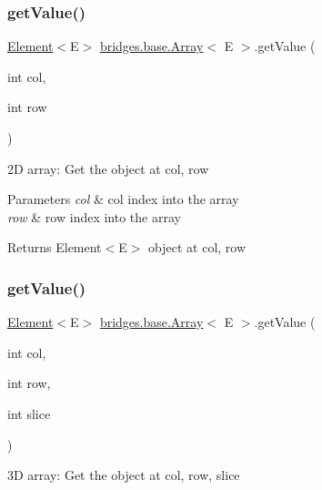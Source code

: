 \subsubsection{\texorpdfstring{get\+Value()}{getValue()}\hspace{0.1cm}{\footnotesize\ttfamily [2/3]}}
{\footnotesize\ttfamily \hyperlink{classbridges_1_1base_1_1_element}{Element}$<$E$>$ \hyperlink{classbridges_1_1base_1_1_array}{bridges.\+base.\+Array}$<$ E $>$.get\+Value (\begin{DoxyParamCaption}\item[{int}]{col,  }\item[{int}]{row }\end{DoxyParamCaption})}

2D array\+: Get the object at \textquotesingle{}col, row\textquotesingle{}


\begin{DoxyParams}{Parameters}
{\em col} & col index into the array \\
\hline
{\em row} & row index into the array\\
\hline
\end{DoxyParams}
\begin{DoxyReturn}{Returns}
Element$<$\+E$>$ object at \textquotesingle{}col, row\textquotesingle{} 
\end{DoxyReturn}
\hypertarget{classbridges_1_1base_1_1_array_a5aa6a1d31c6eadf8aa948ac2ea9a18fc}{}\label{classbridges_1_1base_1_1_array_a5aa6a1d31c6eadf8aa948ac2ea9a18fc} 
\subsubsection{\texorpdfstring{get\+Value()}{getValue()}\hspace{0.1cm}{\footnotesize\ttfamily [3/3]}}
{\footnotesize\ttfamily \hyperlink{classbridges_1_1base_1_1_element}{Element}$<$E$>$ \hyperlink{classbridges_1_1base_1_1_array}{bridges.\+base.\+Array}$<$ E $>$.get\+Value (\begin{DoxyParamCaption}\item[{int}]{col,  }\item[{int}]{row,  }\item[{int}]{slice }\end{DoxyParamCaption})}

3D array\+: Get the object at \textquotesingle{}col, row, slice\textquotesingle{}


